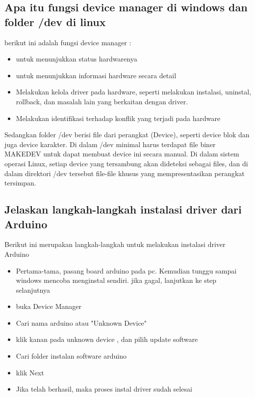 \subsection{Apa itu fungsi device manager di windows dan folder /dev di linux}
berikut ini adalah fungsi device manager :
\begin{itemize}
	\item untuk menunjukkan status hardwarenya
	\item untuk menunjukkan informasi hardware secara detail
	\item Melakukan kelola driver pada hardware, seperti melakukan instalasi, uninstal, rollback, dan masalah lain yang berkaitan dengan driver.
	\item Melakukan identifikasi terhadap konflik yang terjadi pada hardware
\end{itemize}

Sedangkan folder /dev berisi file dari perangkat (Device), seperti device blok dan juga device karakter. Di dalam /dev minimal harus terdapat file biner MAKEDEV untuk dapat membuat device ini secara manual.
Di dalam sistem operasi Linux, setiap device yang tersambung akan dideteksi sebagai files, dan di dalam direktori /dev tersebut file-file khusus yang mempresentasikan perangkat tersimpan.

\subsection{Jelaskan langkah-langkah instalasi driver dari Arduino}
Berikut ini merupakan langkah-langkah untuk melakukan instalasi driver Arduino
\begin{itemize}
	\item Pertama-tama, pasang board arduino pada pc. Kemudian tunggu sampai windows mencoba menginstal sendiri. jika gagal, lanjutkan ke step selanjutnya
	\item buka Device Manager 
	\item Cari nama arduino atau "Unknown Device"
	\item klik kanan pada unknown device , dan pilih update software
	\item Cari folder instalan software arduino
	\item klik Next
	\item Jika telah berhasil, maka proses instal driver sudah selesai
\end{itemize}

